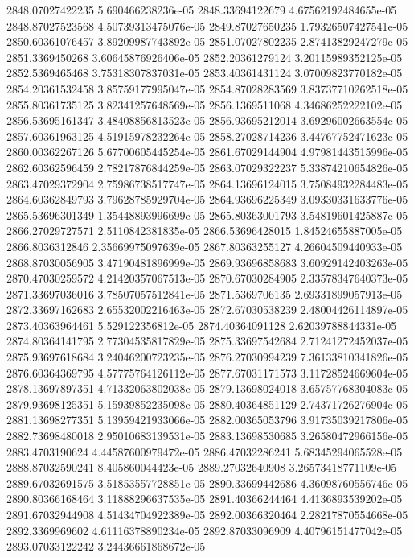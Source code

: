 {2848.07027422235 5.690466238236e-05
2848.33694122679 4.67562192484655e-05
2848.87027523568 4.50739313475076e-05
2849.87027650235 1.79326507427541e-05
2850.60361076457 3.89209987743892e-05
2851.07027802235 2.87413829247279e-05
2851.3369450268 3.60645876926406e-05
2852.20361279124 3.20115989352125e-05
2852.5369465468 3.75318307837031e-05
2853.40361431124 3.07009823770182e-05
2854.20361532458 3.85759177995047e-05
2854.87028283569 3.83737710262518e-05
2855.80361735125 3.82341257648569e-05
2856.1369511068 4.34686252222102e-05
2856.53695161347 3.48408856813523e-05
2856.93695212014 3.69296002663554e-05
2857.60361963125 4.51915978232264e-05
2858.27028714236 3.44767752471623e-05
2860.00362267126 5.67700605445254e-05
2861.67029144904 4.97981443515996e-05
2862.60362596459 2.78217876844259e-05
2863.07029322237 5.33874210654826e-05
2863.47029372904 2.75986738517747e-05
2864.13696124015 3.75084932284483e-05
2864.60362849793 3.79628785929704e-05
2864.93696225349 3.09330331633776e-05
2865.53696301349 1.35448893996699e-05
2865.80363001793 3.54819601425887e-05
2866.27029727571 2.5110842381835e-05
2866.53696428015 1.84524655887005e-05
2866.8036312846 2.35669975097639e-05
2867.80363255127 4.26604509440933e-05
2868.87030056905 3.47190481896999e-05
2869.93696858683 3.60929142403263e-05
2870.47030259572 4.21420357067513e-05
2870.67030284905 2.33578347640373e-05
2871.33697036016 3.78507057512841e-05
2871.5369706135 2.69331899057913e-05
2872.33697162683 2.65532002216463e-05
2872.67030538239 2.48004426114897e-05
2873.40363964461 5.529122356812e-05
2874.40364091128 2.62039788844331e-05
2874.80364141795 2.77304535817829e-05
2875.33697542684 2.71241272452037e-05
2875.93697618684 3.24046200723235e-05
2876.27030994239 7.36133810341826e-05
2876.60364369795 4.57775764126112e-05
2877.67031171573 3.11728524669604e-05
2878.13697897351 4.71332063802038e-05
2879.13698024018 3.65757768304083e-05
2879.93698125351 5.15939852235098e-05
2880.40364851129 2.74371726276904e-05
2881.13698277351 5.13959421933066e-05
2882.00365053796 3.91735039217806e-05
2882.73698480018 2.95010683139531e-05
2883.13698530685 3.26580472966156e-05
2883.4703190624 4.44587600979472e-05
2886.47032286241 5.68345294065528e-05
2888.87032590241 8.405860044423e-05
2889.27032640908 3.26573418771109e-05
2889.67032691575 3.51853557728851e-05
2890.33699442686 4.36098760556746e-05
2890.80366168464 3.11888296637535e-05
2891.40366244464 4.4136893539202e-05
2891.67032944908 4.51434704922389e-05
2892.00366320464 2.28217870554668e-05
2892.3369969602 4.61116378890234e-05
2892.87033096909 4.40796151477042e-05
2893.07033122242 3.24436661868672e-05
}
